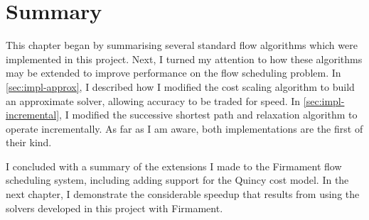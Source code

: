 
\section{Summary}

This chapter began by summarising several standard flow algorithms which were implemented in this project. Next, I turned my attention to how these algorithms may be extended to improve performance on the flow scheduling problem. In \cref{sec:impl-approx}, I described how I modified the cost scaling algorithm to build an approximate solver, allowing accuracy to be traded for speed. In \cref{sec:impl-incremental}, I modified the successive shortest path and relaxation algorithm to operate incrementally. As far as I am aware, both implementations are the first of their kind.

I concluded with a summary of the extensions I made to the Firmament flow scheduling system, including adding support for the Quincy cost model. In the next chapter, I demonstrate the considerable speedup that results from using the solvers developed in this project with Firmament.